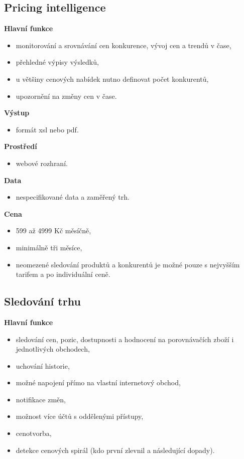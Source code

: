 \documentclass[thesis=B,czech]{FITthesis}[2012/06/26]
\begin{document}
\newpage

\subsection{Pricing intelligence\cite{pricingIntelligence}} 

\textbf{Hlavní funkce}
\begin{itemize}
\item monitorování a srovnávání cen konkurence, vývoj cen a trendů v čase,
\item přehledné výpisy výsledků,
\item u většiny cenových nabídek nutno definovat počet konkurentů,
\item upozornění na změny cen v čase.
\end{itemize}

\textbf{Výstup}
\begin{itemize}
\item formát xsl nebo pdf.
\end{itemize}

\textbf{Prostředí}
\begin{itemize}
\item webové rozhraní.
\end{itemize}

\textbf{Data}
\begin{itemize}
\item nespecifikované data a zaměřený trh.
\end{itemize}

\textbf{Cena}
\begin{itemize}
\item 599 až 4999 Kč měsíčně,
\item minimálně tři měsíce,
\item neomezené sledování produktů a konkurentů je možné pouze s nejvyšším tarifem a po individuální ceně.
\end{itemize}


\subsection{Sledování trhu\cite{sledovaniTrhu}} 
\textbf{Hlavní funkce}
\begin{itemize}
\item sledování cen, pozic, dostupnosti a hodnocení na porovnávačích zboží i jednotlivých obchodech,
\item uchování historie,
\item možné napojení přímo na vlastní internetový obchod,
\item notifikace změn,
\item možnost více účtů s oddělenými přístupy,
\item cenotvorba,
\item detekce cenových spirál (kdo první zlevnil a následující dopady).
\end{itemize}
\end{document}
